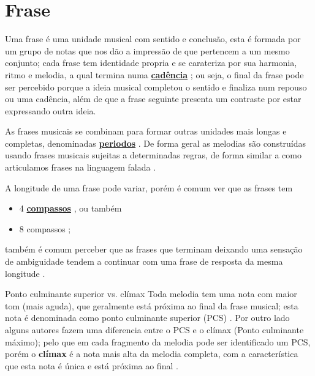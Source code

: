 \section{Frase}
\label{sec:Frase}
Uma frase é uma unidade musical com sentido e conclusão,
esta é formada por um grupo de notas que nos dão a impressão de que pertencem a um mesmo conjunto; 
cada frase tem identidade propria e se carateriza por sua harmonia, ritmo e melodia, 
a qual termina numa \hyperref[sec:Cadencia]{\textbf{cadência}} \cite[pp. 624]{latham2008diccionario} \cite[pp. 335]{medteoria} \cite[pp. 34]{bennett1993elementos};
ou seja, o final da frase pode ser percebido porque a ideia musical completou o sentido 
e finaliza num repouso ou uma cadência, 
além de que a frase seguinte presenta um contraste por estar expressando outra ideia.


As frases musicais se combinam para formar outras unidades mais longas e completas, 
denominadas \hyperref[sec:Periodo]{\textbf{periodos}} \cite[pp. 624]{latham2008diccionario}.
De forma geral as melodias são construídas usando frases musicais sujeitas a determinadas
regras, de forma similar a como articulamos frases na linguagem falada \cite[pp. 334]{medteoria}.


A longitude de uma frase pode variar, 
porém é comum ver que as frases tem
\begin{itemize}
\item 4 \hyperref[sec:compaso]{\textbf{compassos}} \cite[pp. 624]{latham2008diccionario} \cite[pp. 34]{bennett1993elementos}, 
ou também 
\item 8 compassos  \cite[pp. 335]{medteoria} \cite[pp. 34]{bennett1993elementos};
\end{itemize}
também é comum perceber que as frases que terminam deixando uma sensação de ambiguidade 
tendem a continuar com uma frase de resposta da mesma longitude \cite[pp. 624]{latham2008diccionario}.


\begin{tcbinformation}{Ponto culminante superior vs. clímax}
\label{ref:PontoCulminanteSuperior} 
Toda melodia tem uma nota com maior tom (mais aguda), que geralmente está próxima ao final da frase musical;
esta nota é denominada como ponto culminante superior (PCS) \cite[pp. 336]{medteoria}.
Por outro lado alguns autores fazem uma diferencia entre 
o PCS e o clímax (Ponto culminante máximo);
pelo que em cada fragmento da melodia pode ser identificado um PCS,
porém o \textbf{clímax} é a nota mais alta da melodia completa, 
com a característica que esta nota é única e está próxima ao final \cite[pp. 12]{melos2012} \cite{HARTMANN2013} \cite[pp. 50]{holland2013music}.
\label{ref:climax}
\end{tcbinformation} 


